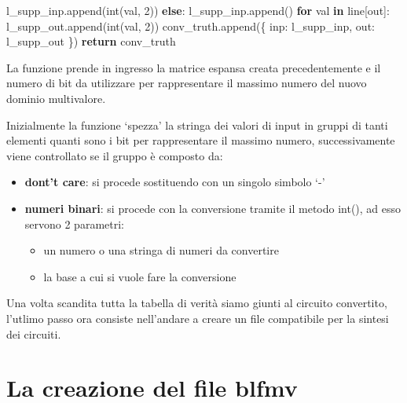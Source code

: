 \documentclass[
  italian,
]{book}
\newenvironment{Shaded}{\begin{snugshade}}{\end{snugshade}}
\newcommand{\BuiltInTok}[1]{#1}
\newcommand{\ControlFlowTok}[1]{\textcolor[rgb]{0.13,0.29,0.53}{\textbf{#1}}}
\newcommand{\DecValTok}[1]{\textcolor[rgb]{0.00,0.00,0.81}{#1}}
\newcommand{\KeywordTok}[1]{\textcolor[rgb]{0.13,0.29,0.53}{\textbf{#1}}}
\newcommand{\NormalTok}[1]{#1}
\newcommand{\StringTok}[1]{\textcolor[rgb]{0.31,0.60,0.02}{#1}}
\providecommand{\tightlist}{%
  \setlength{\itemsep}{0pt}\setlength{\parskip}{0pt}}
\begin{document}
\begin{Shaded}
\begin{Highlighting}[]
\NormalTok{                    l\_supp\_inp.append(}\BuiltInTok{int}\NormalTok{(val, }\DecValTok{2}\NormalTok{))}
                \ControlFlowTok{else}\NormalTok{:}
\NormalTok{                    l\_supp\_inp.append(}\StringTok{\textquotesingle{}{-}\textquotesingle{}}\NormalTok{)}
            \ControlFlowTok{for}\NormalTok{ val }\KeywordTok{in}\NormalTok{ line[}\StringTok{\textquotesingle{}out\textquotesingle{}}\NormalTok{]:}
\NormalTok{                l\_supp\_out.append(}\BuiltInTok{int}\NormalTok{(val, }\DecValTok{2}\NormalTok{))}
\NormalTok{            conv\_truth.append(\{}
                \StringTok{\textquotesingle{}inp\textquotesingle{}}\NormalTok{:  l\_supp\_inp,}
                \StringTok{\textquotesingle{}out\textquotesingle{}}\NormalTok{:  l\_supp\_out}
\NormalTok{            \})}
    \ControlFlowTok{return}\NormalTok{ conv\_truth}
\end{Highlighting}
\end{Shaded}

La funzione prende in ingresso la matrice espansa creata precedentemente e il numero di bit da utilizzare per rappresentare il massimo numero del nuovo dominio multivalore.

Inizialmente la funzione `spezza' la stringa dei valori di input in gruppi di tanti elementi quanti sono i bit per rappresentare il massimo numero, successivamente viene controllato se il gruppo è composto da:

\begin{itemize}
\tightlist
\item
  \textbf{dont't care}: si procede sostituendo con un singolo simbolo `-'
\item
  \textbf{numeri binari}: si procede con la conversione tramite il metodo int(), ad esso servono 2 parametri:

  \begin{itemize}
  \tightlist
  \item
    un numero o una stringa di numeri da convertire
  \item
    la base a cui si vuole fare la conversione
  \end{itemize}
\end{itemize}

Una volta scandita tutta la tabella di verità siamo giunti al circuito convertito, l'utlimo passo ora consiste nell'andare a creare un file compatibile per la sintesi dei circuiti.

\hypertarget{la-creazione-del-file-blfmv}{%
\section{La creazione del file blfmv}\label{la-creazione-del-file-blfmv}}
\end{document}
